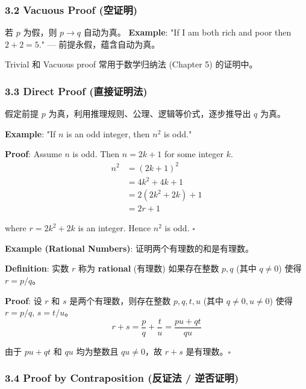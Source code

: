 \documentclass[10pt,a4paper,openany]{ctexbook}
\theoremstyle{definition}
\theoremstyle{remark}
\renewenvironment{quote}
  {\list{}{\leftmargin=1em\rightmargin=0pt\topsep=0.5pt\partopsep=0pt}\item[]}
  {\endlist}
\begin{document}
\subsubsection{3.2 Vacuous Proof (空证明)}

若 $p$ 为假，则 $p \to q$ 自动为真。
\textbf{Example}: "If I am both rich and poor then $2 + 2 = 5$." — 前提永假，蕴含自动为真。
\begin{quote}
Trivial 和 Vacuous proof 常用于数学归纳法 (Chapter 5) 的证明中。

\end{quote}
\vspace{-2pt}

\subsubsection{3.3 Direct Proof (直接证明法)}

\begin{quote}
假定前提 $p$ 为真，利用推理规则、公理、逻辑等价式，逐步推导出 $q$ 为真。

\textbf{Example}: "If $n$ is an odd integer, then $n^2$ is odd."

\textbf{Proof}: Assume $n$ is odd. Then $n = 2k + 1$ for some integer $k$.
\[
\begin{aligned}
n^2 &= (2k+1)^2 \\
    &= 4k^2 + 4k + 1 \\
    &= 2(2k^2 + 2k) + 1 \\
    &= 2r + 1
\end{aligned}
\]

where $r = 2k^2 + 2k$ is an integer. Hence $n^2$ is odd. $\square$

\textbf{Example (Rational Numbers)}: 证明两个有理数的和是有理数。

\textbf{Definition}: 实数 $r$ 称为 \textbf{rational} (有理数) 如果存在整数 $p, q$ (其中 $q \neq 0$) 使得 $r = p / q$。

\textbf{Proof}: 设 $r$ 和 $s$ 是两个有理数，则存在整数 $p, q, t, u$ (其中 $q \neq 0, u \neq 0$) 使得 $r = p/q$, $s = t/u$。
\[
r + s = \frac{p}{q} + \frac{t}{u} = \frac{pu + qt}{qu}
\]

由于 $pu + qt$ 和 $qu$ 均为整数且 $qu \neq 0$，故 $r + s$ 是有理数。$\square$

\end{quote}
\vspace{-2pt}

\subsubsection{3.4 Proof by Contraposition (反证法 / 逆否证明)}
\end{document}
